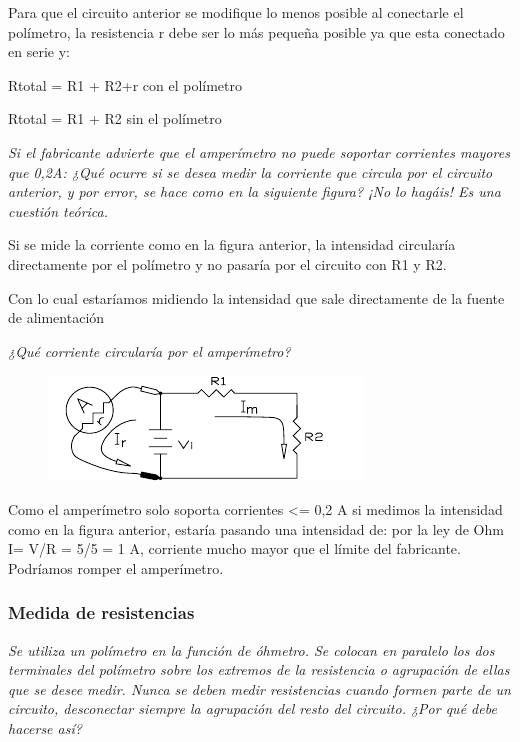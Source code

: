 \documentclass[paper=a4, fontsize=11pt]{scrartcl} %
\numberwithin{equation}{section} %
\numberwithin{figure}{section} %
\numberwithin{table}{section} %
\begin{document}
\newpage

Para que el circuito anterior se modifique lo menos posible al conectarle el polímetro, la resistencia r debe ser lo más pequeña posible ya que esta conectado en serie y: \newline

Rtotal =  R1 + R2+r con el polímetro

Rtotal = R1 + R2 sin el polímetro \newline

\textit{Si el fabricante advierte que el amperímetro no puede soportar corrientes mayores que 0,2A: ¿Qué ocurre si se desea medir la corriente que circula por el circuito anterior, y por error, se hace como en la siguiente figura?  ¡No lo hagáis!  Es una cuestión teórica.} \newline

Si se mide la corriente como en la figura anterior, la intensidad circularía directamente por el polímetro y no pasaría por el circuito con R1 y R2. \newline

Con lo cual estaríamos midiendo la intensidad que sale directamente de la fuente de alimentación \newline

\textit{¿Qué corriente circularía por el amperímetro?}

\begin{figure}[h]
	\centering
	\includegraphics{image/medida-intensidad2}
\end{figure}

Como el amperímetro solo soporta corrientes <= 0,2 A si medimos la intensidad como en la figura anterior, estaría pasando una intensidad de: por la ley de Ohm I= V/R = 5/5 = 1 A, corriente mucho mayor que el límite del fabricante. Podríamos romper el amperímetro.\newline

\subsubsection{Medida de resistencias} 

\textit{Se utiliza un polímetro en la función de óhmetro. Se colocan en paralelo los dos terminales del polímetro sobre los extremos de la resistencia o agrupación de ellas que se desee medir. Nunca se deben medir resistencias cuando formen parte de un circuito, desconectar siempre la agrupación del resto del circuito. ¿Por qué debe hacerse así?} \newline
\end{document}
